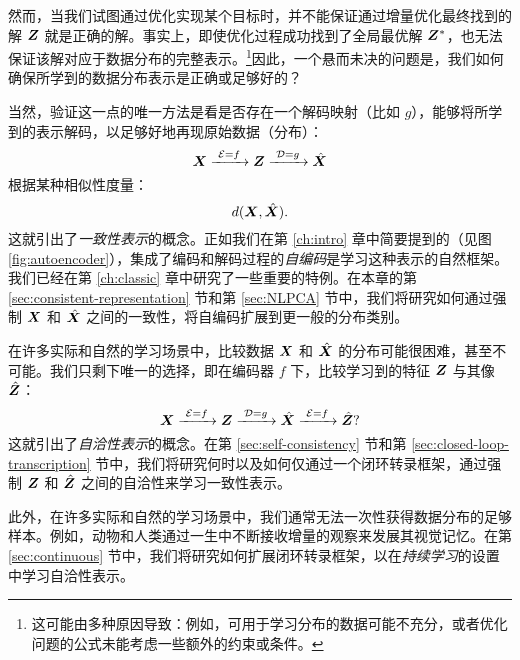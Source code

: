 \documentclass[../../book-main_zh.tex]{subfiles}
\begin{document}
然而，当我们试图通过优化实现某个目标时，并不能保证通过增量优化最终找到的解 $\bm{Z}$ 就是正确的解。事实上，即使优化过程成功找到了全局最优解 $\bm{Z}^*$，也无法保证该解对应于数据分布的完整表示。\footnote{这可能由多种原因导致：例如，可用于学习分布的数据可能不充分，或者优化问题的公式未能考虑一些额外的约束或条件。}因此，一个悬而未决的问题是，我们如何确保所学到的数据分布表示是正确或足够好的？

当然，验证这一点的唯一方法是看是否存在一个解码映射（比如 $g$），能够将所学到的表示解码，以足够好地再现原始数据（分布）：
\begin{equation}
  \bm{X}
  \xrightarrow{\hspace{1mm} \mathcal{E} = f \hspace{1mm}} \bm{Z}
  \xrightarrow{\hspace{1mm} \mathcal{D} = g \hspace{1mm}} \hat{\bm{X}}
\end{equation}
根据某种相似性度量：
\begin{equation}
  d(\bm{X}, \hat {\bm{X}}).
\end{equation}
这就引出了{\em 一致性表示}的概念。正如我们在第 \ref{ch:intro} 章中简要提到的（见图 \ref{fig:autoencoder}），集成了编码和解码过程的{\em 自编码}是学习这种表示的自然框架。我们已经在第 \ref{ch:classic} 章中研究了一些重要的特例。在本章的第 \ref{sec:consistent-representation} 节和第 \ref{sec:NLPCA} 节中，我们将研究如何通过强制 $\bm{X}$ 和 $\hat {\bm{X}}$ 之间的一致性，将自编码扩展到更一般的分布类别。

在许多实际和自然的学习场景中，比较数据 $\bm{X}$ 和 $\hat {\bm{X}}$ 的分布可能很困难，甚至不可能。我们只剩下唯一的选择，即在编码器 $f$ 下，比较学习到的特征 $\bm{Z}$ 与其像 $\hat {\bm{Z}}$：
\begin{equation}
 \bm{X}
\xrightarrow{\hspace{1mm} \mathcal{E} = f \hspace{1mm}} \bm{Z}  \xrightarrow{\hspace{1mm} \mathcal{D} = g \hspace{1mm}} \hat{\bm{X}} \xrightarrow{\hspace{1mm} \mathcal{E} = f \hspace{1mm}} \hat {\bm{Z}}?
\end{equation}
这就引出了{\em 自洽性表示}的概念。在第 \ref{sec:self-consistency} 节和第 \ref{sec:closed-loop-transcription} 节中，我们将研究何时以及如何仅通过一个闭环转录框架，通过强制 $\bm{Z}$ 和 $\hat {\bm{Z}}$ 之间的自洽性来学习一致性表示。

此外，在许多实际和自然的学习场景中，我们通常无法一次性获得数据分布的足够样本。例如，动物和人类通过一生中不断接收增量的观察来发展其视觉记忆。在第 \ref{sec:continuous} 节中，我们将研究如何扩展闭环转录框架，以在{\em 持续学习}的设置中学习自洽性表示。
\end{document}
